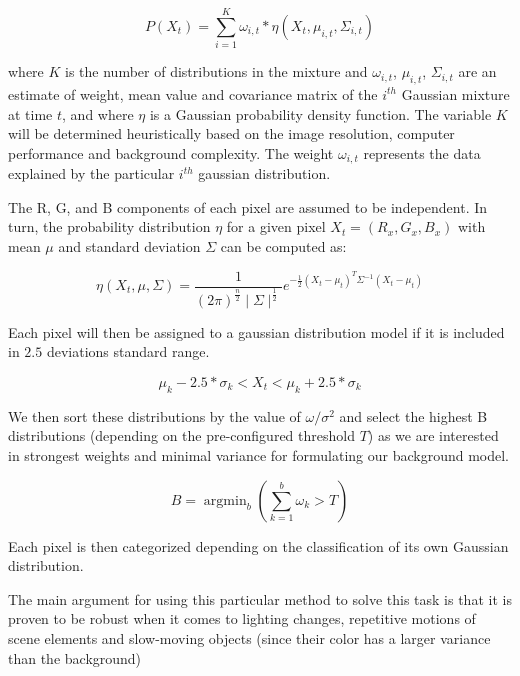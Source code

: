 \begin{equation}
P(X_t) = \sum_{i=1}^{K} \omega_{i,t} \ast \eta(X_{t},\mu_{i,t},\Sigma_{i,t})
\end{equation}  

where $K$ is the number of distributions in the mixture and $\omega_{i,t}$, $\mu_{i,t}$, $\Sigma_{i,t}$ are an estimate of weight, mean value and covariance matrix of the $i^{th}$ Gaussian mixture at time $t$, and where $\eta$ is a Gaussian probability density function. The variable $K$ will be determined heuristically based on the image  resolution, computer performance and background complexity. The weight $\omega_{i,t}$ represents the data explained by the particular $i^{th}$ gaussian distribution. 

The R, G, and B components of each pixel are assumed to be independent. In turn, the probability distribution $\eta$ for a given pixel $X_t = (R_x, G_x, B_x)$ with mean $\mu$ and standard deviation $\Sigma$ can be computed as:

\begin{equation}
\eta(X_t,\mu,\Sigma) = \frac{1}{(2\pi)^{\frac{n}{2}} \mid\Sigma\mid ^{\frac{1}{2}}} e^{-\frac{1}{2}(X_{t}-\mu_{t})^{T}\Sigma^{-1}(X_{t}-\mu_{t})}
\end{equation}

Each pixel will then be assigned to a gaussian distribution model if it is included in $2.5$ deviations standard range.

\begin{equation}
\mu_{k}-2.5 * \sigma_{k}<X_{t}<\mu_{k}+2.5 * \sigma_{k}
\end{equation}

We then sort these distributions by the value of $\omega / \sigma^2$ and select the highest B distributions (depending on the pre-configured threshold $T$) as we are interested in strongest weights and minimal variance for formulating our background model.  

\begin{equation}
B=\operatorname{argmin}_{b}\left(\sum_{k=1}^{b} \omega_{k}>T\right)
\end{equation}

Each pixel is then categorized depending on the classification of its own Gaussian distribution.

\medskip
The main argument for using this particular method to solve this task is that it is proven to be robust when it comes to lighting changes, repetitive motions of scene elements and slow-moving objects (since their color has a larger variance than the background)